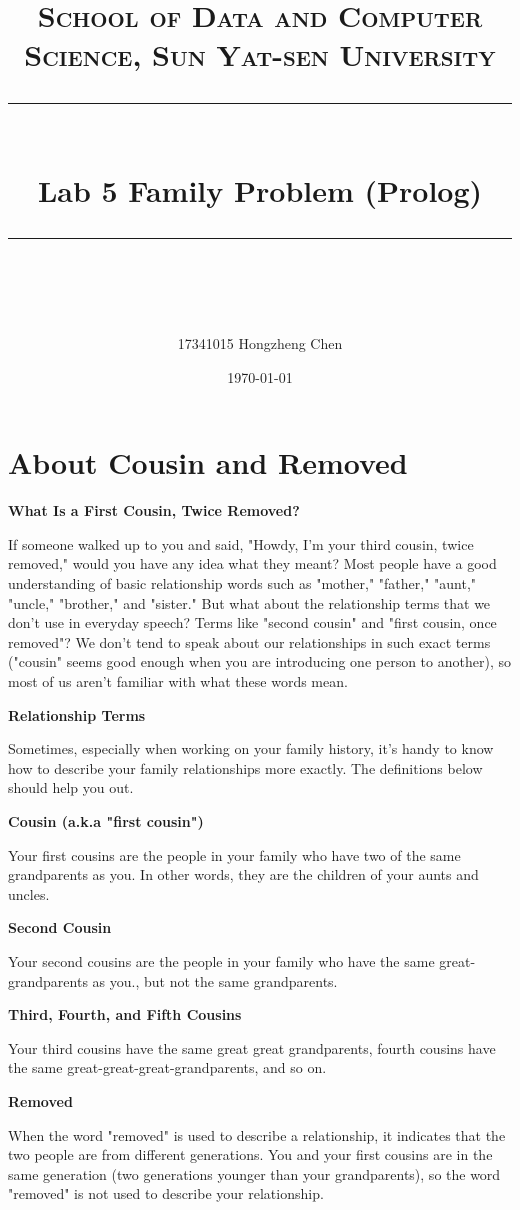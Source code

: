 ﻿\documentclass[a4paper, 11pt]{article}
\title{	
\normalfont \normalsize
\textsc{School of Data and Computer Science, Sun Yat-sen University} \\ [25pt] %
\rule{\textwidth}{0.5pt} \\[0.4cm] %
\huge  Lab 5 Family Problem (Prolog)\\ %
\rule{\textwidth}{2pt} \\[0.5cm] %
\author{17341015 Hongzheng Chen}
\date{\normalsize\today}
}
\begin{document}
\maketitle
\tableofcontents
\newpage

\section{About Cousin and Removed}
\textbf{What Is a First Cousin, Twice Removed?}

If someone walked up to you and said, "Howdy, I'm your third cousin, twice removed," would you have any idea what they meant? Most people have a good understanding of basic relationship words such as "mother," "father," "aunt," "uncle," "brother," and "sister." But what about the relationship terms that we don't use in everyday speech? Terms like "second cousin" and "first cousin, once removed"? We don't tend to speak about our relationships in such exact terms ("cousin" seems good enough when you are introducing one person to another), so most of us aren't familiar with what these words mean.

\textbf{Relationship Terms}

Sometimes, especially when working on your family history, it's handy to know how to describe your family relationships more exactly. The definitions below should help you out.

\textbf{Cousin (a.k.a "first cousin")}

Your first cousins are the people in your family who have two of the same grandparents as you. In other words, they are the children of your aunts and uncles.

\textbf{Second Cousin}

Your second cousins are the people in your family who have the same great-grandparents as you., but not the same grandparents.

\textbf{Third, Fourth, and Fifth Cousins}

Your third cousins have the same great great grandparents, fourth cousins have the same great-great-great-grandparents, and so on.

\textbf{Removed}

When the word "removed" is used to describe a relationship, it indicates that the two people are from different generations. You and your first cousins are in the same generation (two generations younger than your grandparents), so the word "removed" is not used to describe your relationship.
\end{document}
